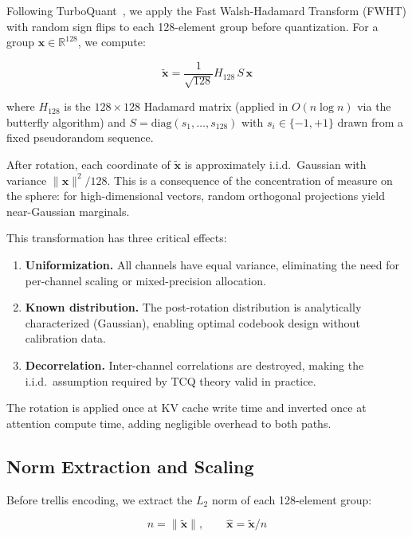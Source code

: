 \documentclass{article}
\newcommand{\R}{\mathbb{R}}
\begin{document}
Following TurboQuant~\cite{turboquant2026}, we apply the Fast Walsh-Hadamard
Transform (FWHT) with random sign flips to each 128-element group before
quantization. For a group $\mathbf{x} \in \R^{128}$, we compute:

\begin{equation}
\tilde{\mathbf{x}} = \frac{1}{\sqrt{128}} H_{128} \, S \, \mathbf{x}
\end{equation}

where $H_{128}$ is the $128 \times 128$ Hadamard matrix (applied in
$O(n \log n)$ via the butterfly algorithm) and $S = \mathrm{diag}(s_1, \ldots,
s_{128})$ with $s_i \in \{-1, +1\}$ drawn from a fixed pseudorandom sequence.

After rotation, each coordinate of $\tilde{\mathbf{x}}$ is approximately i.i.d.\
Gaussian with variance $\|\mathbf{x}\|^2 / 128$. This is a consequence of the
concentration of measure on the sphere: for high-dimensional vectors, random
orthogonal projections yield near-Gaussian marginals.

This transformation has three critical effects:
\begin{enumerate}
\item \textbf{Uniformization.} All channels have equal variance, eliminating the
  need for per-channel scaling or mixed-precision allocation.
\item \textbf{Known distribution.} The post-rotation distribution is analytically
  characterized (Gaussian), enabling optimal codebook design without calibration
  data.
\item \textbf{Decorrelation.} Inter-channel correlations are destroyed, making
  the i.i.d.\ assumption required by TCQ theory valid in practice.
\end{enumerate}

The rotation is applied once at KV cache write time and inverted once at
attention compute time, adding negligible overhead to both paths.

\subsection{Norm Extraction and Scaling}
\label{sec:norm}

Before trellis encoding, we extract the $L_2$ norm of each 128-element group:

\begin{equation}
n = \|\tilde{\mathbf{x}}\|, \qquad \hat{\mathbf{x}} = \tilde{\mathbf{x}} / n
\end{equation}
\end{document}

